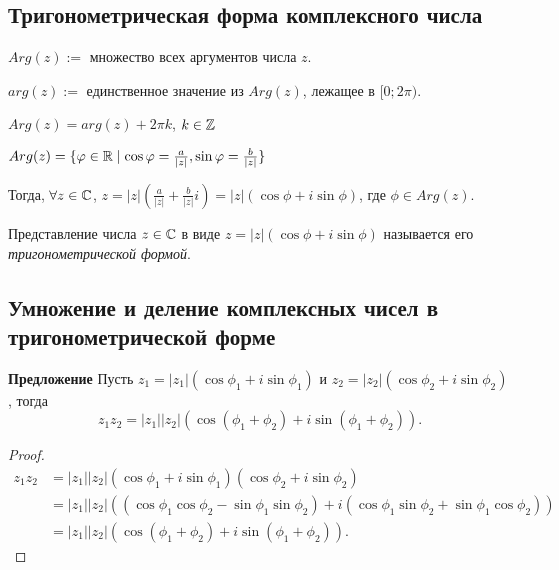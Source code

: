 \begin{comment}
    При $z \neq 0$, аргумент определен с точностью до $2 \pi k$, $k \in \ZZ$.
\end{comment}

\begin{comment}
    При $z = 0$, удобно считать что любое $\phi$ является аргументом.
\end{comment}


\subsection{Тригонометрическая форма комплексного числа}

$Arg(z) :=$ множество всех аргументов числа $z$.

$arg(z) :=$ единственное значение из $Arg(z)$, лежащее в $[0; 2 \pi)$.

$Arg(z) = arg(z) + 2 \pi k$, $k \in \mathbb{Z}$

$Arg(z) = \{\varphi \in \mathbb{R} \mid \cos \varphi = \frac{a}{|z|}, \sin \varphi = \frac{b}{|z|}\}$

Тогда, $\forall z \in \mathbb{C}$, $z = |z| \left(\frac{a}{|z|} + \frac{b}{|z|} i\right) = |z| \left(\cos \phi + i \sin \phi\right)$, где $\phi \in Arg(z)$.

\begin{definition}
    Представление числа $z \in \mathbb{C}$ в виде $z = |z|(\cos \phi + i \sin \phi)$ называется его \textit{тригонометрической формой}.
\end{definition}


\subsection{Умножение и деление комплексных чисел в тригонометрической форме}

\textbf{Предложение}
Пусть $z_1 = |z_1| (\cos \phi_1 + i \sin \phi_1)$ и $z_2 = |z_2| (\cos \phi_2 + i \sin \phi_2)$, тогда
\begin{equation*}
    z_1 z_2 = |z_1| |z_2| (\cos (\phi_1 + \phi_2) + i \sin(\phi_1 + \phi_2))
.\end{equation*}

\begin{proof}
    \begin{align*}
        z_1 z_2 &= |z_1||z_2|(\cos \phi_1 + i \sin \phi_1)(\cos \phi_2 + i \sin \phi_2)  \\
                &= |z_1||z_2|((\cos \phi_1 \cos \phi_2 - \sin \phi_1 \sin \phi_2) + i(\cos \phi_1 \sin \phi_2 + \sin \phi_1 \cos \phi_2)) \\
                &= |z_1||z_2|(\cos (\phi_1 + \phi_2) + i \sin(\phi_1 + \phi_2))
    .\end{align*}
\end{proof}

